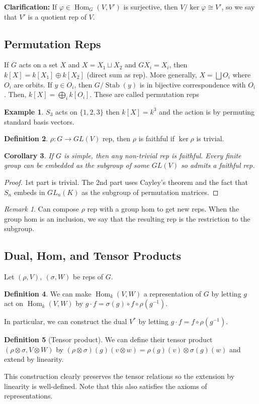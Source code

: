 \documentclass{article}
\theoremstyle{definition}
\newtheorem{defn}{Definition}[section]
\newtheorem{example}[defn]{Example}
\theoremstyle{remark}
\newtheorem{rem}{Remark}
\theoremstyle{plain}
\newtheorem{crly}[defn]{Corollary}
\newcommand{\Hom}{\operatorname{Hom}}
\begin{document}
\textbf{Clarification:} If $\varphi\in\operatorname{Hom}_G(V,V')$ is surjective, then $V/\ker\varphi\cong V'$, so we say that $V'$ is a quotient rep of $V$.

\subsection{Permutation Reps}

If $G$ acts on a set $X$ and $X=X_1\sqcup X_2$ and $GX_i=X_i$, then $k[X]=k[X_1]\oplus k[X_2]$ (direct sum as rep). More generally, $X=\bigsqcup O_i$ where $O_i$ are orbits. If $y\in O_i$, then $G/\operatorname{Stab}(y)$ is in bijective correspondence with $O_i$. Then, $k[X]=\bigoplus_i k[O_i]$. These are called permutation reps

\begin{example}
    $S_3$ acts on $\{1,2,3\}$ then $k[X]=k^3$ and the action is by permuting standard basis vectors.
\end{example}
\begin{defn}
    $\rho:G\to GL(V)$ rep, then $\rho$ is faithful if $\ker\rho$ is trivial.
\end{defn}
\begin{crly}
    If $G$ is simple, then any non-trivial rep is faithful. Every finite group can be embedded as the subgroup of some $GL(V)$ so admits a faithful rep.
\end{crly}
\begin{proof}
    1st part is trivial. The 2nd part uses Cayley's theorem and the fact that $S_n$ embeds in $GL_n(K)$ as the subgroup of permutation matrices.
\end{proof}
\begin{rem}
    Can compose $\rho$ rep with a group hom to get new reps. When the group hom is an inclusion, we say that the resulting rep is the restriction to the subgroup.
\end{rem}

\subsection{Dual, Hom, and Tensor Products}
Let $(\rho, V),\ (\sigma, W)$ be reps of $G$.
\begin{defn}
    We can make $\Hom_k(V,W)$ a representation of $G$ by letting $g$ act on $\Hom_k(V,W)$ by $g\cdot f=\sigma(g)\circ f\circ\rho(g^{-1})$.
\end{defn}
In particular, we can construct the dual $V^\ast$ by letting $g\cdot f=f\circ\rho(g^{-1})$.
\begin{defn}[Tensor product]
    We can define their tensor product $(\rho\otimes\sigma,V\otimes W)$ by $(\rho\otimes \sigma)(g)(v\otimes w)=\rho(g)(v)\otimes\sigma(g)(w)$ and extend by linearity.
\end{defn}
This construction clearly preserves the tensor relations so the extension by linearity is well-defined. Note that this also satisfies the axioms of representations.
\end{document}
